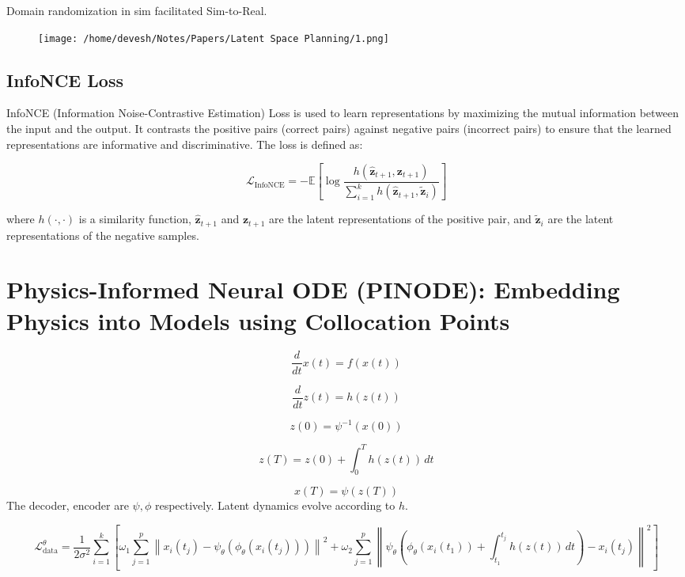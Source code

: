 \documentclass[12pt]{article}
\begin{document}
Domain randomization in sim facilitated Sim-to-Real.
\begin{figure}[ht]
    \centering
    \texttt{[image: /home/devesh/Notes/Papers/Latent Space Planning/1.png]}
    \caption{}
    \label{fig:latent_dynamics}
\end{figure}

\subsection{InfoNCE Loss}
InfoNCE (Information Noise-Contrastive Estimation) Loss is used to learn representations by maximizing the mutual information between the input and the output. It contrasts the positive pairs (correct pairs) against negative pairs (incorrect pairs) to ensure that the learned representations are informative and discriminative. The loss is defined as:

\[
\mathcal{L}_{\text{InfoNCE}} = -\mathbb{E} \left[ \log \frac{h(\hat{\mathbf{z}}_{t+1}, \mathbf{z}_{t+1})}{\sum_{i=1}^{k} h(\hat{\mathbf{z}}_{t+1}, \tilde{\mathbf{z}}_i)} \right]
\]

where \(h(\cdot, \cdot)\) is a similarity function, \(\hat{\mathbf{z}}_{t+1}\) and \(\mathbf{z}_{t+1}\) are the latent representations of the positive pair, and \(\tilde{\mathbf{z}}_i\) are the latent representations of the negative samples.

\newpage
\section{Physics-Informed Neural ODE (PINODE): Embedding Physics into Models using Collocation Points}
\begin{multicols}{2}
\[
\frac{d}{dt} x(t) = f(x(t))
\]

\[
\frac{d}{dt} z(t) = h(z(t))
\]

\[
z(0) = \psi^{-1}(x(0))
\]

\[
z(T) = z(0) + \int_{0}^{T} h(z(t)) \, dt
\]

\[
x(T) = \psi(z(T))
\]
The decoder, encoder are \(\psi , \phi\) respectively. Latent dynamics evolve according to \(h\).
\end{multicols}

\[
\mathcal{L}_{\text{data}}^{\theta} = \frac{1}{2\sigma^2} \sum_{i=1}^{k} \left[ \omega_1 \sum_{j=1}^{p} \left\| x_i(t_j) - \psi_{\theta} (\phi_{\theta} (x_i(t_j))) \right\|^2 + \omega_2 \sum_{j=1}^{p} \left\| \psi_{\theta} \left( \phi_{\theta} (x_i(t_1)) + \int_{t_1}^{t_j} h(z(t)) \, dt \right) - x_i(t_j) \right\|^2 \right]
\]
\end{document}

